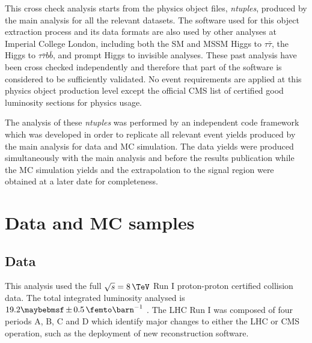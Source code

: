 This cross check analysis starts from the physics object files, \textit{ntuples}, produced by the main analysis for all the relevant datasets. The software used for this object extraction process and its data formats are also used by other analyses at Imperial College London, including both the \gls{SM} and \gls{MSSM} Higgs to $\tau\bar{\tau}$, the Higgs to $\tau\bar{\tau}b\bar{b}$, and prompt Higgs to invisible analyses. These past analysis have been cross checked independently and therefore that part of the software is considered to be sufficiently validated. No event requirements are applied at this physics object production level except the official \gls{CMS} list of certified good luminosity sections for physics usage.
 
The analysis of these \textit{ntuples} was performed by an independent code framework which was developed in order to replicate all relevant event yields produced by the main analysis for data and \gls{MC} simulation. The data yields were produced simultaneously with the main analysis and before the results publication while the \gls{MC} simulation yields and the extrapolation to the signal region were obtained at a later date for completeness. 

\section{Data and MC samples}


\subsection{Data}


This analysis used the full  $\sqrt{s}=8\,\TeV$ Run I proton-proton certified collision data. The total integrated luminosity analysed is $19.2 \pm 0.5 \,\femto\barn^{-1}$ \cite{ARTICLE:CMSLuminosityBasedonPixelClusterCounting}. The \gls{LHC} Run I was composed of four periods A, B, C and D which identify major changes to either the \gls{LHC} or \gls{CMS} operation, such as the deployment of new reconstruction software.


